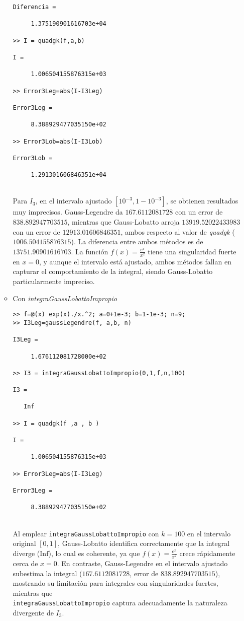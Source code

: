 \documentclass[a4paper]{article}
\begin{document}
\begin{itemize}
\begin{itemize}
\begin{lstlisting}[frame=single, style=Matlab-Pyglike]
Diferencia =

     1.375190901616703e+04

>> I = quadgk(f,a,b)

I =

     1.006504155876315e+03

>> Error3Leg=abs(I-I3Leg)

Error3Leg =

     8.388929477035150e+02

>> Error3Lob=abs(I-I3Lob)

Error3Lob =

     1.291301606846351e+04
    \end{lstlisting}
    \\
Para \( I_3 \), en el intervalo ajustado \( [10^{-3}, 1 - 10^{-3}] \), se obtienen resultados muy imprecisos. Gauss-Legendre da \( 167.6112081728 \) con un error de \( 838.892947703515 \), mientras que Gauss-Lobatto arroja \( 13919.52022433983 \) con un error de \( 12913.01606846351 \), ambos respecto al valor de \textit{quadgk} (\( 1006.504155876315 \)). La diferencia entre ambos métodos es de \( 13751.90901616703 \). La función \( f(x) = \frac{e^x}{x^2} \) tiene una singularidad fuerte en \( x = 0 \), y aunque el intervalo está ajustado, ambos métodos fallan en capturar el comportamiento de la integral, siendo Gauss-Lobatto particularmente impreciso.    
    \item Con \textit{integraGaussLobattoImpropio}
    \\
\begin{lstlisting}[frame=single, style=Matlab-Pyglike]
>> f=@(x) exp(x)./x.^2; a=0+1e-3; b=1-1e-3; n=9;
>> I3Leg=gaussLegendre(f, a,b, n)

I3Leg =

     1.676112081728000e+02

>> I3 = integraGaussLobattoImpropio(0,1,f,n,100)

I3 =

   Inf

>> I = quadgk(f ,a , b )

I =

     1.006504155876315e+03

>> Error3Leg=abs(I-I3Leg)

Error3Leg =

     8.388929477035150e+02
\end{lstlisting}
    \\
Al emplear \texttt{integraGaussLobattoImpropio} con \( k = 100 \) en el intervalo original \( [0, 1] \), Gauss-Lobatto identifica correctamente que la integral diverge (\( \text{Inf} \)), lo cual es coherente, ya que \( f(x) = \frac{e^x}{x^2} \) crece rápidamente cerca de \( x = 0 \). En contraste, Gauss-Legendre en el intervalo ajustado subestima la integral (\( 167.6112081728 \), error de \( 838.892947703515 \)), mostrando su limitación para integrales con singularidades fuertes, mientras que \\ \texttt{integraGaussLobattoImpropio} captura adecuadamente la naturaleza divergente de \( I_3 \).

\end{itemize}
\end{itemize}
\end{document}
